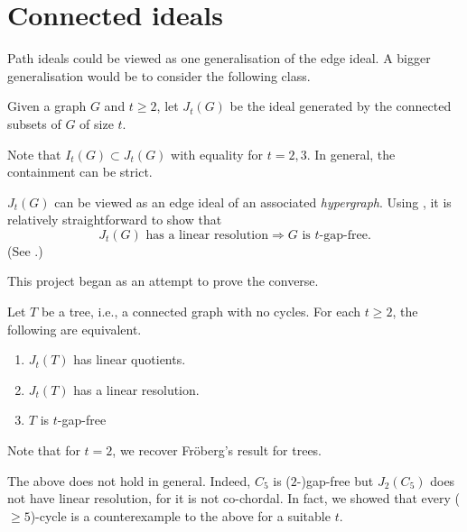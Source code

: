 \documentclass[12pt]{article}
\begin{document}
\section{Connected ideals}

Path ideals could be viewed as one generalisation of the edge ideal. A bigger generalisation would be to consider the following class.

\begin{defn}
	Given a graph $G$ and $t \ge 2$, let $J_{t}(G)$ be the ideal generated by the connected subsets of $G$ of size $t$.
\end{defn}
Note that $I_{t}(G) \subset J_{t}(G)$ with equality for $t = 2, 3$. In general, the containment can be strict. 

\begin{rem}
	$J_{t}(G)$ can be viewed as an edge ideal of an associated \emph{hypergraph}. Using \cite[Theorem 1.4]{HaWoodroofe}, it is relatively straightforward to show that
	\begin{equation*} 
		J_{t}(G) \text{ has a linear resolution} \Rightarrow \text{$G$ is $t$-gap-free}.
	\end{equation*}
	(See \cite[Corollary 4.3]{AnanthnarayanJavadekarMaithani}.)

	This project began as an attempt to prove the converse.
\end{rem}

\begin{thm} \label{thm:theorem-for-trees}
	Let $T$ be a tree, i.e., a connected graph with no cycles. For each $t \ge 2$, the following are equivalent.
	\begin{enumerate}[label=(\alph*)]
		\item $J_{t}(T)$ has linear quotients.
        \item $J_{t}(T)$ has a linear resolution.
        \item $T$ is $t$-gap-free
	\end{enumerate}
\end{thm}
Note that for $t = 2$, we recover Fr\"{o}berg's result for trees.

The above does not hold in general. Indeed, $C_{5}$ is ($2$-)gap-free but $J_{2}(C_{5})$ does not have linear resolution, for it is not co-chordal. In fact, we showed that every ($\ge 5$)-cycle is a counterexample to the above for a suitable $t$. 
\end{document}
